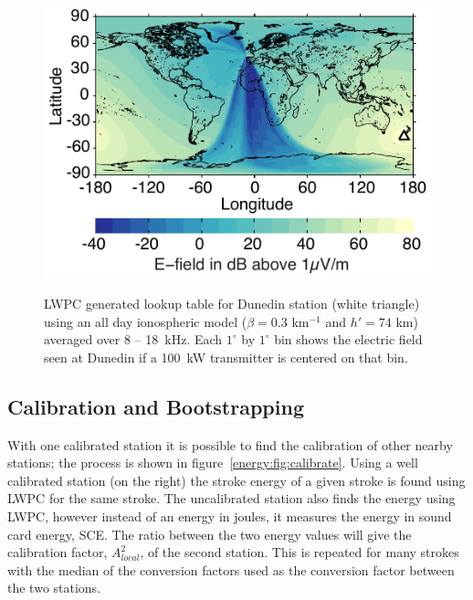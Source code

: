 \begin{figure}[ht!]
\centering
\includegraphics[scale=1]{energy/Figures/PPS_Lookup.pdf}\\
\caption{LWPC generated lookup table for Dunedin station (white triangle) using an all day ionospheric model ($\beta=0.3$ km$^{-1}$ and $h'=74$ km) averaged over 8 -- 18~kHz. Each $1^{\circ}$ by $1^{\circ}$ bin shows the electric field seen at Dunedin if a 100~kW transmitter is centered on that bin.}
\label{energy:fig:lookup}
\end{figure}

\subsection{Calibration and Bootstrapping}

With one calibrated station it is possible to find the calibration of other nearby stations; the process is shown in figure~\ref{energy:fig:calibrate}.
Using a well calibrated station (on the right) the stroke energy of a given stroke is found using LWPC for the same stroke.
The uncalibrated station also finds the energy using LWPC, however instead of an energy in joules, it measures the energy in sound card energy, SCE.
The ratio between the two energy values will give the calibration factor, $A_{local}^2$, of the second station.
This is repeated for many strokes with the median of the conversion factors used as the conversion factor between the two stations.

